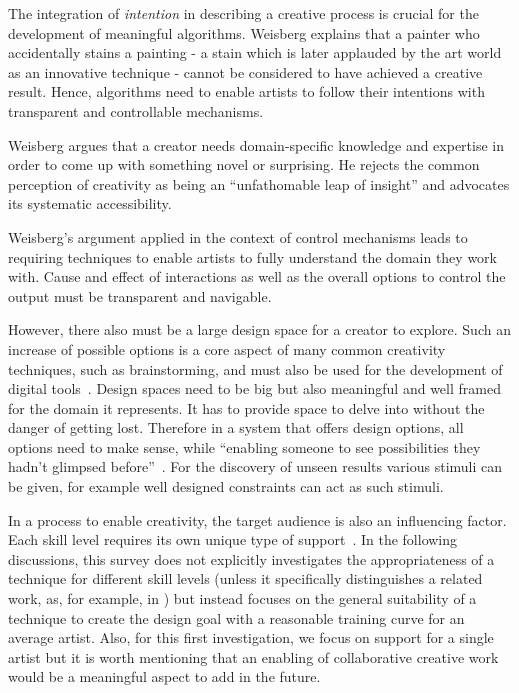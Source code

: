 The integration of \textit{intention} in describing a creative process is crucial for the development of meaningful algorithms. Weisberg explains that a painter who accidentally stains a painting - a stain which is later applauded by the art world as an innovative technique - cannot be considered to have achieved a creative result. Hence, algorithms need to enable artists to follow their intentions with transparent and controllable mechanisms. 

Weisberg argues that a creator needs domain-specific knowledge and expertise in order to come up with something novel or surprising. He rejects the common perception of creativity as being an ``unfathomable leap of insight'' and advocates its systematic accessibility. 

Weisberg's argument applied in the context of control mechanisms leads to requiring techniques to enable artists to fully understand the domain they work with. Cause and effect of interactions as well as the overall options to control the output must be transparent and navigable.

However, there also must be a large design space for a creator to explore. 
Such an increase of possible options is a core aspect of many common creativity techniques, such as brainstorming, and must also be used for the development of digital tools~\cite{terry_2004_vea}. Design spaces need to be big but also meaningful and well framed for the domain it represents. It has to provide space to delve into without the danger of getting lost. 
Therefore in a system that offers design options, all options need to make sense, while ``enabling someone to see possibilities they hadn't glimpsed before''~\cite{boden_2010_cat}. For the discovery of unseen results various stimuli can be given, for example well designed constraints can act as such stimuli. 


In a process to enable creativity, the target audience is also an influencing factor. Each skill level requires its own unique type of support~\cite{cherry_2014_qcs}. 
In the following discussions, this survey does not explicitly investigates the appropriateness of a technique for different skill levels (unless it specifically distinguishes a related work, as, for example, in \cite{benedetti_2014_pba}) but instead focuses on the general suitability of a technique to create the design goal with a reasonable training curve for an average artist. Also, for this first investigation, we focus on support for a single artist but it is worth mentioning that an enabling of collaborative creative work would be a meaningful aspect to add in the future.

